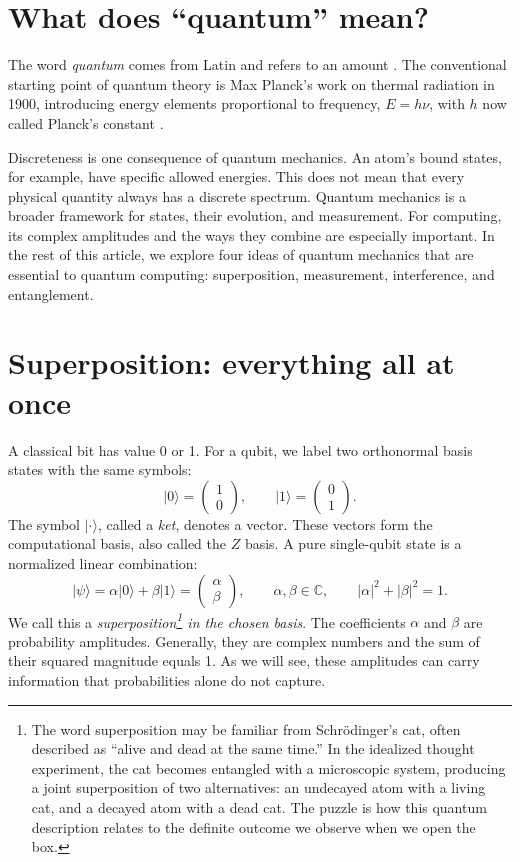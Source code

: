 \documentclass[11pt,a4paper]{article}
\newcommand{\ket}[1]{\lvert #1\rangle}
\begin{document}
\section{What does ``quantum'' mean?}
The word \emph{quantum} comes from Latin and refers to an amount \cite{etymology}. The conventional starting point of quantum theory is Max Planck's work on thermal radiation in 1900, introducing energy elements proportional to frequency, $E=h\nu$, with $h$ now called Planck's constant \cite{planck}.

Discreteness is one consequence of quantum mechanics. An atom's bound states, for example, have specific allowed energies. This does not mean that every physical quantity always has a discrete spectrum. Quantum mechanics is a broader framework for states, their evolution, and measurement. For computing, its complex amplitudes and the ways they combine are especially important. In the rest of this article, we explore four ideas of quantum mechanics that are essential to quantum computing: superposition, measurement, interference, and entanglement.

\newpage
\section{Superposition: everything all at once}
A classical bit has value 0 or 1. For a qubit, we label two orthonormal basis states with the same symbols:
\begin{equation}
\ket{0}=\begin{pmatrix}1\\0\end{pmatrix},\qquad
\ket{1}=\begin{pmatrix}0\\1\end{pmatrix}.
\end{equation}
The symbol $\ket{\cdot}$, called a \emph{ket}, denotes a vector. These vectors form the computational basis, also called the $Z$ basis. A pure single-qubit state is a normalized linear combination:
\begin{equation}\label{eq:pure}
\ket{\psi}=\alpha\ket{0}+\beta\ket{1}
=\begin{pmatrix}\alpha\\\beta\end{pmatrix},\qquad
\alpha,\beta\in\mathbb C,\qquad |\alpha|^2+|\beta|^2=1.
\end{equation}
We call this a \emph{superposition\footnote{The word superposition may be familiar from Schr\"odinger's cat, often described as ``alive and dead at the same time.'' In the idealized thought experiment, the cat becomes entangled with a microscopic system, producing a joint superposition of two alternatives: an undecayed atom with a living cat, and a decayed atom with a dead cat. The puzzle is how this quantum description relates to the definite outcome we observe when we open the box.} in the chosen basis}. The coefficients $\alpha$ and $\beta$ are probability amplitudes. Generally, they are complex numbers and the sum of their squared magnitude equals 1. As we will see, these amplitudes can carry information that probabilities alone do not capture.
\end{document}
